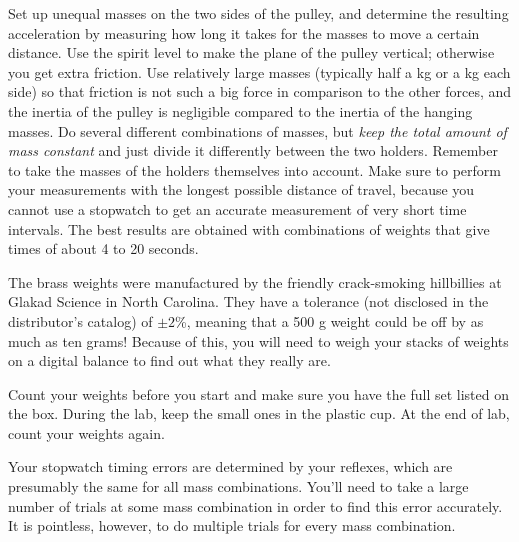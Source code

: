 \label{lab:atwood}

\apparatus
{}


\observations


Set up unequal masses on the two sides of the pulley, and
determine the resulting acceleration by measuring how long
it takes for the masses to move a certain distance. 
Use the spirit level to make the plane of the pulley vertical; otherwise you
get extra friction.
Use relatively large
masses (typically half a kg or a kg each side) so that friction
is not such a big force in comparison to the other forces, and
the inertia of the pulley is negligible compared to the inertia
of the hanging masses.
Do several different combinations of masses, but \emph{keep
the total amount of mass constant} and just divide it
differently between the two holders.  Remember to take the
masses of the holders themselves into account. Make sure to
perform your measurements with the longest possible distance
of travel, because you cannot use a stopwatch to get an
accurate measurement of very short time intervals. The best
results are obtained with combinations of weights that give
times of about 4 to 20 seconds.

The brass weights were manufactured by the friendly crack-smoking
hillbillies at Glakad Science in North Carolina. They have a tolerance (not
disclosed in the distributor's catalog) of $\pm 2$\%, meaning
that a 500 g weight could be off by as much as ten grams!
Because of this, you will need to weigh your stacks of weights on
a digital balance to find out what they really are.

Count your weights before you start and make sure you have the full
set listed on the box. During the lab, keep the small ones in the
plastic cup. At the end of lab, count your weights again.

Your stopwatch timing errors are determined by your reflexes, which
are presumably the same for all mass combinations. You'll need to take a large
number of trials at some mass combination in order to find this error accurately.
It is pointless, however, to do multiple trials for every mass combination.

